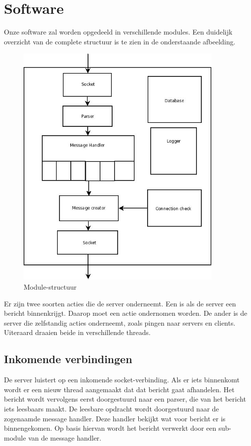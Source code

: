 \documentclass[a4paper,10pt]{article}
\begin{document}
  \section{Software}
  Onze software zal worden opgedeeld in verschillende modules. Een duidelijk overzicht van de complete structuur is te zien in de onderstaande afbeelding.
  \begin{figure}[H]
    \includegraphics[width=0.9\textwidth]{dia1.jpg}
    \caption{Module-structuur}
  \end{figure}
  Er zijn twee soorten acties die de server onderneemt. Een is als de server een bericht binnenkrijgt. Daarop moet een actie ondernomen worden. De ander is de server die zelfstandig acties onderneemt, zoals pingen naar servers en clients. Uiteraard draaien beide in verschillende threads.
  
  \subsection{Inkomende verbindingen}
  De server luistert op een inkomende socket-verbinding. Als er iets binnenkomt wordt er een nieuw thread aangemaakt dat dat bericht gaat afhandelen. Het bericht wordt vervolgens eerst doorgestuurd naar een parser, die van het bericht iets leesbaars maakt. De leesbare opdracht wordt doorgestuurd naar de zogenaamde message handler. Deze handler bekijkt wat voor bericht er is binnengekomen. Op basis hiervan wordt het bericht verwerkt door een sub-module van de message handler. 
  
\end{document}
